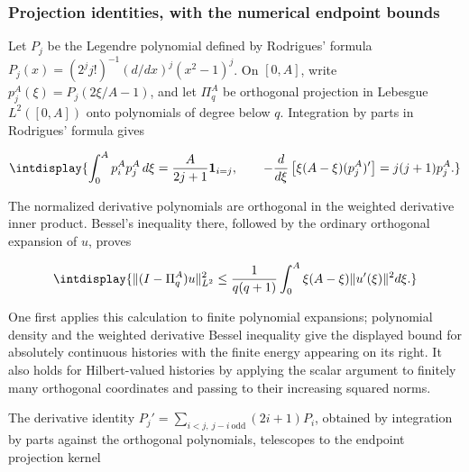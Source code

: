 \subsubsection{Projection identities, with the numerical endpoint bounds}
\label{int:legendre-projection-proof}


Let \(P_j\) be the Legendre polynomial defined by Rodrigues' formula \(P_j(x)=(2^jj!)^{-1}(d/dx)^j(x^2-1)^j\). On \([0,\allowbreak A]\), write \(p_j^A(\xi)=P_j(2\xi/A-1)\), and let \(\Pi_q^A\) be orthogonal projection in Lebesgue \(L^2([0,\allowbreak A])\) onto polynomials of degree below \(q\). Integration by parts in Rodrigues' formula gives


\begingroup\renewcommand{\theHequation}{intdisplay.510}
\begin{equation*}
\intdisplay{
\int_0^Ap_i^Ap_j^A\,d\xi=\frac A{2j+1}\mathbf1_{i=j},
\qquad
-\frac d{d\xi}\left[\xi(A-\xi)(p_j^A)'\right]
=j(j+1)p_j^A.
}
\end{equation*}
\endgroup


The normalized derivative polynomials are orthogonal in the weighted derivative inner product. Bessel's inequality there, followed by the ordinary orthogonal expansion of \(u\), proves


\begingroup\renewcommand{\theHequation}{intdisplay.511}
\begin{equation}
\intdisplay{
\|(I-\Pi_q^A)u\|_{L^2}^2
\le\frac1{q(q+1)}
\int_0^A\xi(A-\xi)\|u'(\xi)\|^2d\xi.
}
\label{int:eq-0217-legendre-weighted-tail}
\end{equation}
\endgroup


One first applies this calculation to finite polynomial expansions; polynomial density and the weighted derivative Bessel inequality give the displayed bound for absolutely continuous histories with the finite energy appearing on its right. It also holds for Hilbert-valued histories by applying the scalar argument to finitely many orthogonal coordinates and passing to their increasing squared norms.



The derivative identity \(P_j'=\sum_{i<j,\allowbreak \ j-i\ \mathrm{odd}}(2i+1)P_i\), obtained by integration by parts against the orthogonal polynomials, telescopes to the endpoint projection kernel


